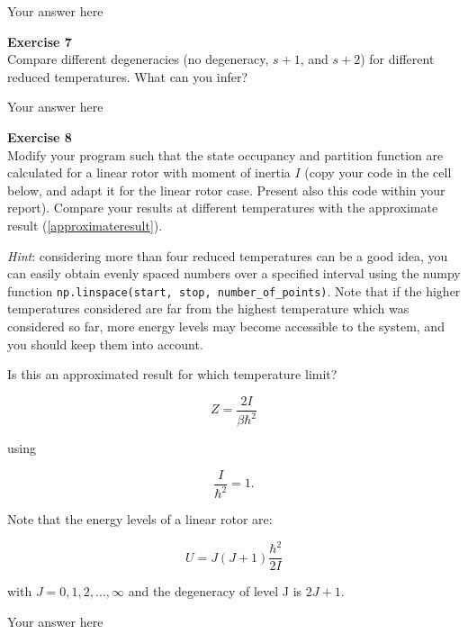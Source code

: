 \documentclass{article}
\begin{document}
Your answer here

\begin{mdframed}
\textbf{Exercise 7}\\
Compare different degeneracies (no degeneracy, $s+1$, and $s+2$) for different reduced temperatures. What can you infer?
\end{mdframed}

Your answer here

\begin{mdframed}
\textbf{Exercise 8}\\
Modify your program such that the state occupancy and partition
function are calculated for a linear rotor with moment of inertia $I$ (copy your code in the cell below, and adapt it for the linear rotor case. Present also this code within your report). Compare your results at different temperatures with the approximate result (\ref{approximateresult}).

\textit{Hint}: considering more than four reduced temperatures can be a good idea, you can easily obtain evenly spaced numbers over a specified interval using the numpy function \texttt{np.linspace(start, stop, number\_of\_points)}.
Note that if the higher temperatures considered are far from the highest temperature which was considered so far, more energy levels may become accessible to the system, and you should keep them into account.

Is this an approximated result for which temperature limit?

\begin{equation}
\label{approximateresult}
Z = \frac{2I}{\beta\hbar^2}
\end{equation}

using

\begin{equation}
\frac{I}{\hbar^2} = 1.
\end{equation}

Note that the energy levels of a linear rotor are:

\begin{equation}
U = J(J+1)\frac{\hbar^2}{2I}
\end{equation}

with $J= 0, 1, 2, \dots, \infty$ and the degeneracy of level J is $2J +1$.
\end{mdframed}

Your answer here

\end{document}
